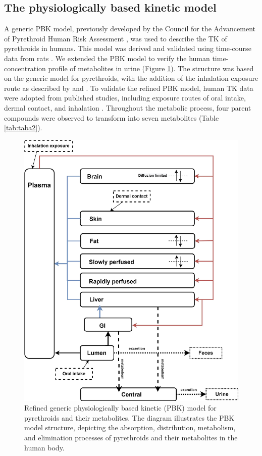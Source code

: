 \documentclass[toxics,article,submit,pdftex,moreauthors]{Definitions/mdpi}
\begin{document}
\subsection{The physiologically based kinetic
model}\label{the-physiologically-based-kinetic-model}

A generic PBK model, previously developed by the Council for the
Advancement of Pyrethroid Human Risk Assessment
\citep{song2019evaluation, mallick2020development, mallick_physiologically_2020},
was used to describe the TK of pyrethroids in humans. This model was
derived and validated using time-course data from rats
\citep{mirfazaelian_development_2006, tornero2010evaluation}. We
extended the PBK model to verify the human time-concentration profile of
metabolites in urine (Figure \ref{fig:fig2}). The structure was based on
the generic model for pyrethroids, with the addition of the inhalation
exposure route as described by \citet{beaudouin2010stochastic} and
\citet{quindroit2019estimating}. To validate the refined PBK model,
human TK data were adopted from published studies, including exposure
routes of oral intake, dermal contact, and inhalation
\citep{leng1997human, leng1997biological, ratelle2015toxicokinetics, ratelle2015time}.
Throughout the metabolic process, four parent compounds were observed to
transform into seven metabolites (Table \ref{tab:taba2}).

\begin{figure}[H]
\includegraphics[width=0.8\linewidth,]{figures/fig2} \caption{Refined generic physiologically based kinetic (PBK) model for pyrethroids and their metabolites. The diagram illustrates the PBK model structure, depicting the absorption, distribution, metabolism, and elimination processes of pyrethroids and their metabolites in the human body.}\label{fig:fig2}
\end{figure}
\end{document}
